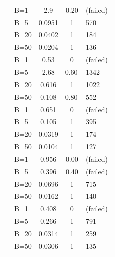 \begin{table}[t]
\begin{tabular}{@{} l l S[scientific-notation=true] S[table-format=1.2] l @{}}
    \midrule
     &    B=1              & \num{2.9} & \num{0.20} & (failed) \\
    &  B=5             & \num{0.0951} &  {1} & \num{570} \\
    &  B=20            & \num{0.0402} &  {1} & \num{184} \\
    &    B=50            & \num{0.0204} &  {1} & \num{136} \\ 
    \midrule
     &   B=1              & \num{0.53} & \num{0} & (failed) \\
    &  B=5             & \num{2.68} & {\num{0.60}\,} & \num{1342} \\
    &  B=20            & \num{0.616} &  {1} & \num{1022} \\
    &  B=50            & \num{0.108} & {\num{0.80}\,} & \num{552} \\ 
  
    \midrule
       &  B=1 & \num{0.651} & \num{0} & (failed) \\
    &  B=5      & \num{0.105} &  {1} & \num{395} \\
    &  B=20     & \num{0.0319} &  {1} & \num{174} \\
    &  B=50     & \num{0.0104} &  {1} & \num{127} \\
     \midrule
         & B=1      & \num{0.956} & \num{0.00} & (failed) \\
    & B=5      & \num{0.396} & \num{0.40} & (failed) \\
    & B=20     & \num{0.0696} &  {1} & \num{715} \\
    & B=50     & \num{0.0162} &  {1} & \num{140} \\
     \midrule
       &  B=1 & \num{0.408} & \num{0} & (failed) \\
    &  B=5      & \num{0.266} &  {1} & \num{791} \\
    &  B=20     & \num{0.0314} &  {1} & \num{259} \\
    &  B=50     & \num{0.0306} &  {1} & \num{135} \\
    \bottomrule





\end{tabular}
\end{table}
